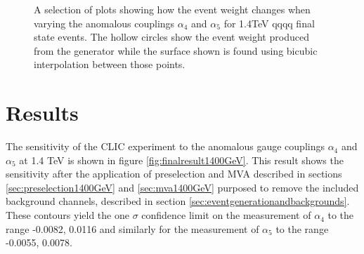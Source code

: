 \begin{figure}[h!]
\caption[Event weights from Whizard for 1.4TeV \nu{\nu}qqqq final state events with interpolated surface.]{A selection of plots showing how the event weight changes when varying the anomalous couplings $\alpha_{4}$ and $\alpha_{5}$ for 1.4TeV \nu{\nu}qqqq final state events.  The hollow circles show the event weight produced from the generator while the surface shown is found using bicubic interpolation between those points.}
\label{fig:eventweights1400interpolated}
\end{figure}


\section{Results}
The sensitivity of the CLIC experiment to the anomalous gauge couplings $\alpha_{4}$ and $\alpha_{5}$ at 1.4 TeV is shown in figure \ref{fig:finalresult1400GeV}.  This result shows the sensitivity after the application of preselection and MVA described in sections \ref{sec:preselection1400GeV} and \ref{sec:mva1400GeV} purposed to remove the included background channels, described in section \ref{sec:eventgenerationandbackgrounds}.  These contours yield the one $\sigma$ confidence limit on the measurement of $\alpha_{4}$ to the range -0.0082, 0.0116 and similarly for the measurement of $\alpha_{5}$ to the range -0.0055, 0.0078.

